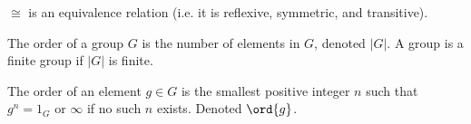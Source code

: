 \documentclass{article}
\begin{document}
\begin{remark}
  $\cong$ is an equivalence relation (i.e. it is reflexive, symmetric, and transitive). 
\end{remark}

\begin{defn}
  The order of a group $G$ is the number of elements in $G$, denoted $|G|$.
  A group is a finite group if $|G|$ is finite. 
\end{defn}

\begin{defn}
  The order of an element $g \in G$ is the smallest positive integer $n$
  such that $g^n = 1_G$ or $\infty$ if no such $n$ exists. Denoted $\ord{g}$. 
\end{defn}
\end{document}
